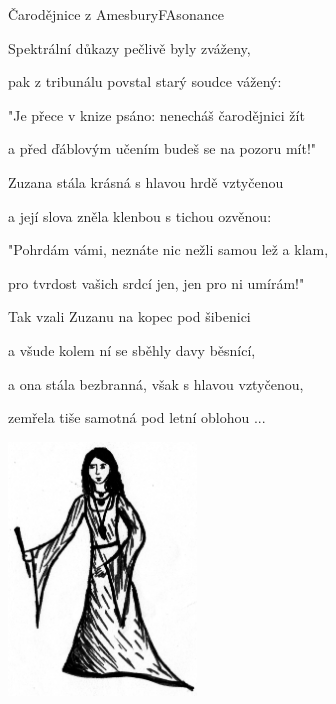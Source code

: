 \begin{song}{Čarodějnice z Amesbury}{F}{Asonance}
\begin{SBVerse}
  \end{SBVerse}

  \begin{SBVerse}
Spektrální důkazy pečlivě byly zváženy,

pak z tribunálu povstal starý soudce vážený:

"Je přece v knize psáno: nenecháš čarodějnici žít

a před ďáblovým učením budeš se na pozoru mít!"

  \end{SBVerse}

  \begin{SBVerse}
Zuzana stála krásná s hlavou hrdě vztyčenou

a její slova zněla klenbou s tichou ozvěnou:

"Pohrdám vámi, neznáte nic nežli samou lež a klam,

pro tvrdost vašich srdcí jen, jen pro ni umírám!"

  \end{SBVerse}

  \begin{SBVerse}
Tak vzali Zuzanu na kopec pod šibenici

a všude kolem ní se sběhly davy běsnící,

a ona stála bezbranná, však s hlavou vztyčenou,

zemřela tiše samotná pod letní oblohou ...


  \end{SBVerse}
  \begin{center}
\includegraphics[width=5cm]{pict/carodejnice_z_amesbury}
\end{center}
\end{song}
